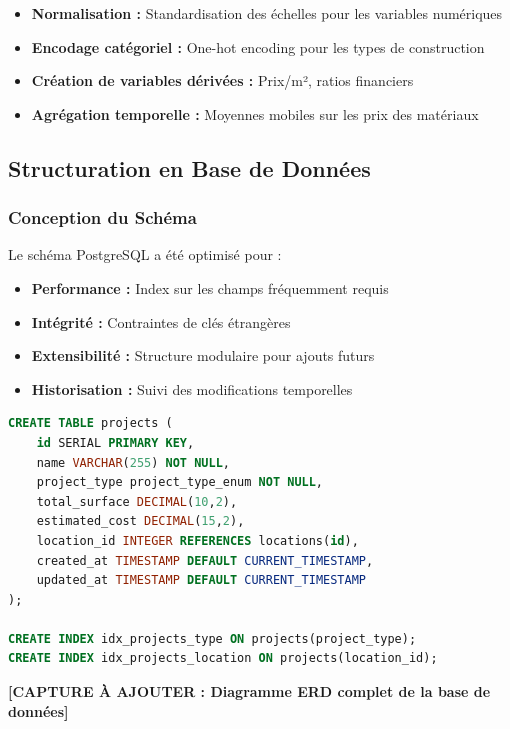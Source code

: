 \begin{itemize}
    \item \textbf{Normalisation :} Standardisation des échelles pour les variables numériques
    \item \textbf{Encodage catégoriel :} One-hot encoding pour les types de construction
    \item \textbf{Création de variables dérivées :} Prix/m², ratios financiers
    \item \textbf{Agrégation temporelle :} Moyennes mobiles sur les prix des matériaux
\end{itemize}

\subsection{Structuration en Base de Données}

\subsubsection{Conception du Schéma}

Le schéma PostgreSQL a été optimisé pour :

\begin{itemize}
    \item \textbf{Performance :} Index sur les champs fréquemment requis
    \item \textbf{Intégrité :} Contraintes de clés étrangères
    \item \textbf{Extensibilité :} Structure modulaire pour ajouts futurs
    \item \textbf{Historisation :} Suivi des modifications temporelles
\end{itemize}

\begin{lstlisting}[language=SQL, caption=Exemple de table optimisée]
CREATE TABLE projects (
    id SERIAL PRIMARY KEY,
    name VARCHAR(255) NOT NULL,
    project_type project_type_enum NOT NULL,
    total_surface DECIMAL(10,2),
    estimated_cost DECIMAL(15,2),
    location_id INTEGER REFERENCES locations(id),
    created_at TIMESTAMP DEFAULT CURRENT_TIMESTAMP,
    updated_at TIMESTAMP DEFAULT CURRENT_TIMESTAMP
);

CREATE INDEX idx_projects_type ON projects(project_type);
CREATE INDEX idx_projects_location ON projects(location_id);
\end{lstlisting}

\textbf{[CAPTURE À AJOUTER : Diagramme ERD complet de la base de données]}

